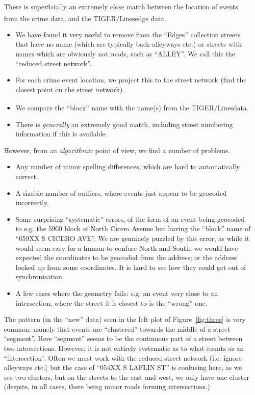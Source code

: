\documentclass[twoside,a4paper,twocolumn,10pt]{article}
\theoremstyle{plain}
\theoremstyle{definition}
\newcommand{\regsym}{\textsuperscript{\textregistered}}
\begin{document}
There is superficially an extremely close match between the location of events from
the crime data, and the TIGER/Lines\regsym edge data.
\begin{itemize}
\item We have found it very
useful to remove from the ``Edges'' collection streets that have no name (which are
typically back-alleyways etc.) or streets with names which are obviously not roads,
such as ``ALLEY''.  We call this the ``reduced street network''.
\item For each crime event location, we project this to the street network (find the
closest point on the street network).
\item We compare the ``block'' name with the name(s) from the TIGER/Lines\regsym data.
\item There is \emph{generally} an extremely good match, including street numbering
  information if this is available.
\end{itemize}
However, from an \emph{algorithmic} point of view, we find a number of problems.
\begin{itemize}
\item Any number of minor spelling differences, which are hard to automatically correct.
\item A sizable number of outliers, where events just appear to be geocoded incorrectly.
\item Some surprising ``systematic'' errors, of the form of an event being geocoded to
  e.g. the 5900 block of North Cicero Avenue but having the ``block'' name of
  ``059XX S CICERO AVE''.  We are genuinely puzzled by this error, as while it would seem
  easy for a human to confuse North and South, we would have expected the coordinates
  to be geocoded from the address; or the address looked up from some coordinates.  It is hard
  to see how they could get out of synchronisation.
\item A few cases where the geometry fails: e.g. an event very close to an intersection,
  where the street it is closest to is the ``wrong'' one.
\end{itemize}

The pattern (in the ``new'' data) seen in the left plot of Figure~\ref{fig:three} is very
common: namely that events are ``clustered'' towards the middle of a street ``segment''.
Here ``segment'' seems to be the continuous part of a street between two intersections.
However, it is not entirely systematic as to what counts as an ``intersection''.
Often we must work with the reduced street network (i.e. ignore alleyways etc.) but the
case of ``054XX S LAFLIN ST'' is confusing here, as we see two clusters, but on the
streets to the east and west, we only have one cluster (despite, in all cases, there
being minor roads forming intersections.)
\end{document}
